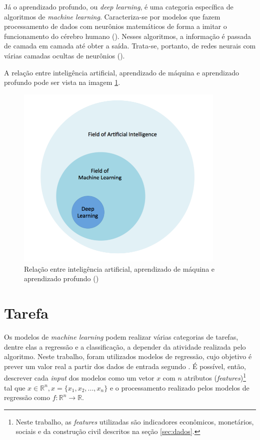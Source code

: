 Já o aprendizado profundo, ou \textit{deep learning}, é uma 
categoria específica de algoritmos de \textit{machine learning}. 
Caracteriza-se por 
modelos que fazem processamento de dados com neurônios 
matemáticos de forma a imitar o 
funcionamento do cérebro humano (\cite{deeplearningbook}). Nesses algoritmos, a informação
é passada de camada em camada até obter a saída. Trata-se, portanto,
de redes neurais com várias camadas ocultas de neurônios (\cite{d2l}). 

A relação entre inteligência artificial, aprendizado de 
máquina e aprendizado profundo pode ser vista na 
imagem \ref{fig:ia_ml}.

\begin{figure}[H] 
  \includegraphics[width= 10cm]{../figuras/ia_ml.png}
  \caption{Relação entre inteligência artificial, aprendizado de máquina e aprendizado profundo (\cite{dl-oreilly})}
  \label{fig:ia_ml}
\end{figure}

\section{Tarefa}
 
Os modelos de \textit{machine learning} podem realizar várias categorias 
de tarefas, dentre elas a regressão e a classificação, a 
depender da atividade realizada pelo algoritmo.
Neste trabalho,  foram utilizados modelos de regressão, cujo objetivo é prever um valor real a 
partir dos dados de entrada segundo \citet{Goodfellow-et-al-2016}.
É possível, então, descrever cada \textit{input} dos modelos como um vetor $x$ com 
$n$ atributos (\textit{features})\footnote{Neste trabalho, 
as \textit{features} utilizadas são indicadores econômicos, monetários,
sociais e da construção civil descritos na seção \ref{sec:dados}.} tal que
$x \in \mathbb{R}^n , x=\{x_1, x_2, ..., x_n\}$ e o 
processamento realizado pelos modelos de regressão como $ f : \mathbb{R}^n \rightarrow \mathbb{R}$. 

